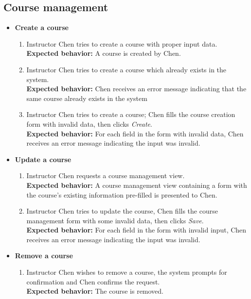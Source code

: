 \subsection{Course management}
\begin{itemize}
    \item \textbf{Create a course} \begin{enumerate}
        \item Instructor Chen tries to create a course with proper input data. \\
        {\bf Expected behavior:} A course is created by Chen.

        \item Instructor Chen tries to create a course which 
            already exists in the system. \\
        {\bf Expected behavior:} Chen receives an error message indicating that
            the same course already exists in the system

        \item Instructor Chen tries to create a course; Chen fills the
            course creation form with invalid data, then clicks \emph{Create}. \\
        {\bf Expected behavior:} For each field in the form with invalid data,
            Chen receives an error message indicating the input was invalid.
    \end{enumerate}

    \item \textbf{Update a course} \begin{enumerate}
        \item Instructor Chen requests a course management view. \\
        {\bf Expected behavior:} A course management view containing a form
            with the course's existing information pre-filled is presented
            to Chen.

        \item Instructor Chen tries to update the course, Chen fills the course
            management form with some invalid data, then clicks \emph{Save}. \\
        {\bf Expected behavior:} For each field in the form with invalid input,
            Chen receives an error message indicating the input was
            invalid.
    \end{enumerate}

    \item \textbf{Remove a course} \begin{enumerate}
        \item Instructor Chen wishes to remove a course, the system prompts
            for confirmation and Chen confirms the request. \\
        {\bf Expected behavior:} The course is removed.
    \end{enumerate}


\end{itemize}
